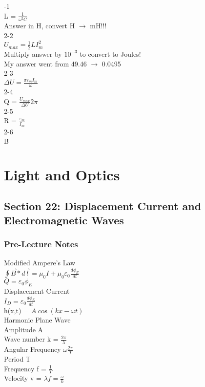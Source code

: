 \documentclass{article}
\begin{document}
\vspace{2mm}

-1 \\
L = $\frac{1}{\omega^2 C}$ \\
Answer in H, convert H $\to$ mH!!! \\
2-2 \\
$U_{max} = \frac{1}{2} L I_m^2$ \\
Multiply answer by $10^{-3}$ to convert to Joules! \\
My answer went from 49.46 $\to$ 0.0495 \\
2-3 \\
$\Delta U = \frac{\pi \varepsilon_m I_m}{\omega}$ \\
2-4 \\
Q = $\frac{U_{max}}{\Delta U} 2 \pi$ \\
2-5 \\
R = $\frac{\varepsilon_m}{I_m}$ \\
2-6 \\
B

\section{Light and Optics}

\subsection{Section 22: Displacement Current and Electromagnetic Waves}
\subsubsection{Pre-Lecture Notes}
\noindent
Modified Ampere's Law \\
$\oint \vec{B} * d \vec{l} = \mu_0 I + \mu_0 \varepsilon_0 \frac{d \phi_E}{dt}$ \\
$Q = \varepsilon_0 \phi_E$ \\
Displacement Current \\
$I_D = \varepsilon_0\frac{d \phi_E}{dt}$ \\
h(x,t) = $A \cos(kx - \omega t)$ \\
Harmonic Plane Wave \\
Amplitude A \\
Wave number k = $\frac{2 \pi}{\lambda}$ \\
Angular Frequency $\omega \frac{2 \pi}{T}$ \\
Period T \\
Frequency f = $\frac{1}{T}$ \\
Velocity v = $\lambda f = \frac{\omega}{k}$
\end{document}
